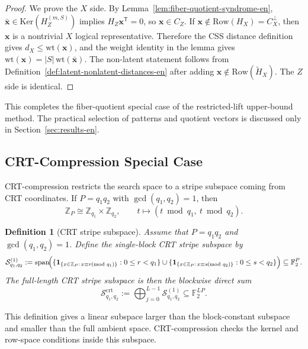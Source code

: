 \documentclass[11pt]{article}
\newcommand{\Ftwo}{\mathbb{F}_2}
\newcommand{\Z}{\mathbb{Z}}
\newcommand{\Ker}{\mathrm{Ker}}
\newcommand{\Row}{\mathrm{Row}}
\newcommand{\wt}{\mathrm{wt}}
\newcommand{\Htil}{\tilde{H}}
\newcommand{\vect}[1]{\bm{#1}}
\newcommand{\vx}{\vect{x}}
\theoremstyle{uprightthm}
\newtheorem{definition}[theorem]{Definition}
\begin{document}
\begin{proof}
We prove the $X$ side.  By Lemma~\ref{lem:fiber-quotient-syndrome-en},
$\bar{\vx}\in\Ker(H_Z^{(m,S)})$ implies
$H_Z\vx^{\mathsf T}=0$, so $\vx\in C_Z$.
If $\vx\notin\Row(H_X)=C_X^\perp$, then $\vx$ is a nontrivial $X$ logical
representative.  Therefore the CSS distance definition gives
$d_X\le\wt(\vx)$, and the weight identity in the lemma gives
$\wt(\vx)=|S|\,\wt(\bar{\vx})$.
The non-latent statement follows from
Definition~\ref{def:latent-nonlatent-distances-en} after adding
$\vx\notin\Row(\Htil_X)$.  The $Z$ side is identical.
\end{proof}

This completes the fiber-quotient special case of the restricted-lift
upper-bound method.  The practical selection of patterns and quotient
vectors is discussed only in Section~\ref{sec:results-en}.

\subsection{CRT-Compression Special Case}
\label{sec:crt-compression-en}
CRT-compression restricts the search space to a stripe subspace coming from CRT
coordinates.  If $P=q_1q_2$ with $\gcd(q_1,q_2)=1$, then
\[
\Z_P \cong \Z_{q_1}\times \Z_{q_2},
\qquad
t\longmapsto (t\bmod q_1,\ t\bmod q_2).
\]

\begin{definition}[CRT stripe subspace]
\label{def:crt-stripe-subspace-en}
Assume that $P=q_1q_2$ and $\gcd(q_1,q_2)=1$.
Define the single-block CRT stripe subspace by
\[
\mathcal{S}^{(1)}_{q_1,q_2}
:=
\operatorname{span}\!\Bigl(
\{\mathbf{1}_{\{x\in\Z_P:\,x\equiv r\!\!\!\pmod{q_1}\}}:0\le r<q_1\}
\cup
\{\mathbf{1}_{\{x\in\Z_P:\,x\equiv s\!\!\!\pmod{q_2}\}}:0\le s<q_2\}
\Bigr)
\subseteq \Ftwo^{P}.
\]
The full-length CRT stripe subspace is then the blockwise direct sum
\[
\mathcal{S}^{\mathrm{crt}}_{q_1,q_2}
:=
\bigoplus_{j=0}^{L-1}\mathcal{S}^{(1)}_{q_1,q_2}
\subseteq \Ftwo^{LP}.
\]
\end{definition}

This definition gives a linear subspace larger than the block-constant subspace
and smaller than the full ambient space.  CRT-compression checks the kernel and
row-space conditions inside this subspace.
\end{document}
